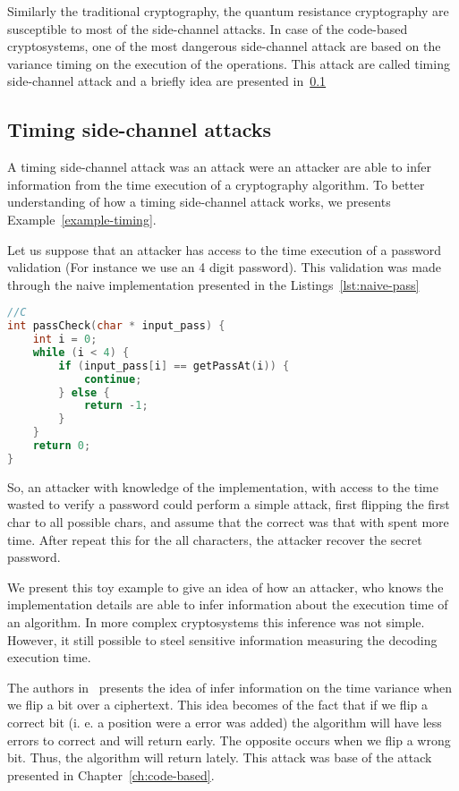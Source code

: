 Similarly the traditional cryptography, the quantum resistance cryptography are susceptible to most of the side-channel attacks. In case of the code-based cryptosystems, one of the most dangerous side-channel attack are based on the variance timing on the execution of the operations. This attack are called timing side-channel attack and a briefly idea are presented in~\ref{sub:timing-attack}

\subsection{Timing side-channel attacks}\label{sub:timing-attack}
A timing side-channel attack was an attack were an attacker are able to infer information from the time execution of a cryptography algorithm. To better understanding of how a timing side-channel attack works, we presents Example~\ref{example-timing}. 

\begin{example}\label{example-timing}
Let us suppose that an attacker has access to the time execution of a password validation (For instance we use an 4 digit password). This validation was made through the naive implementation presented in the Listings~\ref{lst:naive-pass}

\begin{lstlisting}[caption={Naive implementation of password check },label={lst:naive-pass},language=C]
//C
int passCheck(char * input_pass) {
    int i = 0;
    while (i < 4) {
        if (input_pass[i] == getPassAt(i)) {
            continue;
        } else {
            return -1;
        }
    }
    return 0;
}
\end{lstlisting}
So, an attacker with knowledge of the implementation, with access to the time wasted to verify a password could perform a simple attack, first  flipping the first char to all possible chars, and assume that the correct was that with spent more time. After repeat this for the all characters, the attacker recover the secret password.
\end{example}

We present this toy example to give an idea of how an attacker, who knows the implementation details are able to infer information about the execution time of an algorithm. In more complex cryptosystems this inference was not simple. However, it still possible to steel sensitive information measuring the decoding execution time.

The authors in~\cite{shoufan2009timing} presents the idea of infer information on the time variance when we flip a bit over a ciphertext. This idea becomes of the fact that if we flip a correct bit (i. e. a position were a error was added) the algorithm will have less errors to correct and will return early. The opposite occurs when we flip a wrong bit. Thus, the algorithm will return lately. This attack was base of the attack presented in Chapter~\ref{ch:code-based}.


